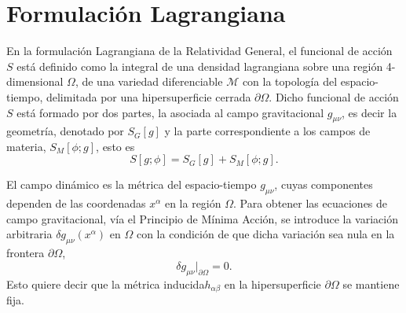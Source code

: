 
\section{Formulaci\'{o}n Lagrangiana}
\label{sec:FL}

En la formulaci\'{o}n Lagrangiana de la Relatividad General, el funcional de acci\'{o}n $S$ est\'{a} definido como la integral de una densidad lagrangiana sobre una regi\'{o}n 4-dimensional $\Omega$, de una variedad diferenciable $\mathcal{M}$ con la topolog\'{i}a del espacio-tiempo, delimitada por una hipersuperficie cerrada $\partial \Omega$.  Dicho funcional de acci\'{o}n $S$ est\'{a} formado por dos partes, la asociada al campo gravitacional $g_{\mu \nu}$, es decir la geometr\'{i}a, denotado por $S_{G}[g]$ y la parte correspondiente a los campos de materia, $S_{M}[\phi; g]$, esto es
%
\begin{equation}
\label{eq:S}
S[g; \phi] = S_{G}[g] + S_{M}[\phi; g].
\end{equation}

El campo din\'{a}mico es la m\'{e}trica del espacio-tiempo $g_{\mu \nu}$, cuyas componentes dependen de las coordenadas $x^{\alpha}$ en la regi\'{o}n $\Omega$. Para obtener las ecuaciones de campo gravitacional, v\'{i}a el Principio de M\'{i}nima Acci\'{o}n, se introduce la variaci\'{o}n arbitraria $\delta g_{\mu \nu}(x^{\alpha})$ en $\Omega$ con la condici\'{o}n de que dicha variaci\'{o}n sea nula en la frontera $\partial \Omega$,
%
\begin{equation}
\label{eq:boundcond}
\delta g_{\mu \nu} \Big|_{\partial \Omega} = 0.
\end{equation}
Esto quiere decir que la m\'{e}trica inducida\footnotemark $h_{\alpha \beta}$ en la hipersuperficie $\partial \Omega$ se mantiene fija.

